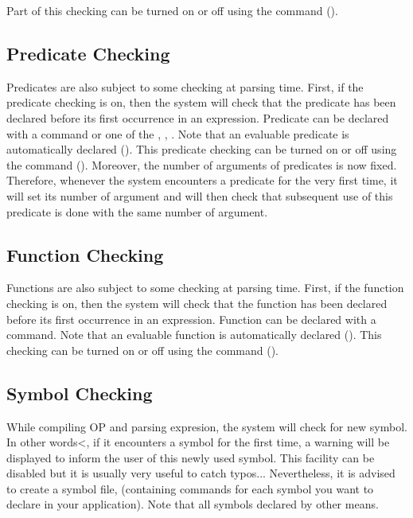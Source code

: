 Part of this checking can be turned on or off using the  command ().

\subsection{Predicate Checking}

Predicates are also subject to some checking at parsing time. First, if the
predicate checking is on, then the system will check that the predicate has
been declared before its first occurrence in an expression. Predicate can be
declared with a  command or one of the , , . Note that an evaluable
predicate is automatically declared (). This predicate checking can be turned on or off using the  command (). Moreover,
the number of arguments of predicates is now fixed. Therefore, whenever the
system encounters a predicate for the very first time, it will set its number
of argument and will then check that subsequent use of this predicate is done
with the same number of argument.

\subsection{Function Checking}

Functions are also subject to some checking at parsing time. First, if the
function checking is on, then the system will check that the function has been
declared before its first occurrence in an expression. Function can be declared
with a  command. Note that an evaluable function is
automatically declared ().  This
checking can be turned on or off using the  command
().

\subsection{Symbol Checking}

While compiling OP and parsing expresion, the system will check for new
symbol. In other words<, if it encounters a symbol for the first time, a warning
will be displayed to inform the user of this newly used symbol. This facility
can be disabled but it is usually very useful to catch typos... Nevertheless,
it is advised to create a symbol file, (containing  commands for
each symbol you want to declare in your application). Note that all symbols
declared by other means. 

